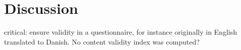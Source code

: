 \section{Discussion}

critical: ensure validity in a questionnaire, for instance originally in English translated to Danish. No content validity index was computed? 